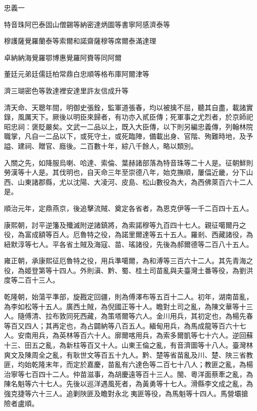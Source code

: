 
\begin{pinyinscope}
忠義一

特音珠阿巴泰固山僧錫等納密達炳圖等書寧阿感濟泰等

穆護薩覺羅蘭泰等索爾和諾齋薩穆等席爾泰滿達理

卓納納海覺羅鄂博惠覺羅阿賚等同阿爾

董廷元弟廷儒廷柏常鼎白忠順等格布庫阿爾津等

濟三瑚密色等敦達裡安達里許友信成升等

清天命、天聰年間，明御史張銓，監軍道張春，均以被擒不屈，聽其自盡，載諸實錄，風厲天下。厥後以明臣來歸者，有功亦入貳臣傳；死軍事之尤烈者，於京師祀昭忠祠：褒貶嚴矣。文武一二品以上，既入大臣傳，以下則另編忠義傳，列翰林院職掌，凡自一二品以下，或死守土，或死臨陣，備載出身、官階、殉難時地，及予謚、建祠、贈官、廕後。二百數十年，綜八千餘人，略以類別。

入關之先，如降服烏喇、哈達、索倫、葉赫諸部落為特音珠等二十人是。征朝鮮則勞漢等十人是。其伐明也，自天命三年至崇德八年，始克撫順，屢偪近畿，分下山西、山東諸郡縣，尤以沈陽、大凌河、皮島、松山數役為大，為西佛萊百六十二人是。

順治元年，定鼎燕京，後追擊流賊、奠定各省者，為恩克伊等一千二百四十五人。

康熙朝，討平逆籓及殲滅附逆諸鎮將，為索諾穆等九百四十七人。親征噶爾丹之役，為富成額等百人。厄魯特之役，為諾里爾達等五十五人。羅剎、西藏諸役，為紐默淳等七人。平各省土賊及海寇、苗、瑤諸役，先後為郝爾德等二百八十五人。

雍正朝，承康熙征厄魯特之役，用兵準噶爾，為和溥等三百六十二人。其先青海之役，為姬登第等十四人。外則滇、黔、蜀、桂土司苗亂與夫臺灣土番等役，為劉洪度等二百十三人。

乾隆朝，始蕩平準部，旋戡定回疆，則為傅澤布等五百十二人。初年，湖南苗亂，為李如松等十五人。廣西土賊，為倪國正等十人。瞻對土司之亂，為陳文華等十三人。隨傅清、拉布敦同死西藏，為策塔爾等六人。金川用兵，其初定也，為楊先春等百又四人；其再定也，為占闢納等八百五人。緬甸用兵，為馬成龍等百六十七人。安南用兵，為英林等百六十人。廓爾喀用兵，為索多爾凱等七十六人。逆回蘇十三、田五之亂，為新柱等百又十人。山東王倫之亂，有音濟圖等十八人。臺灣林爽文及陳周全之亂，有耿世文等百五十九人。黔、楚等省苗亂及川、楚、陜三省教匪，均始乾隆末年，而定於嘉慶，苗亂有六達色等二百七十八人；教匪之亂，為楊治寧等七百四十二人。仲苗滋事，為胡慶遠等百十三人。閩、粵洋面蔡牽之亂，為陳名魁等六十七人。先後以巡洋遇風死者，為黃勇等十七人。滑縣李文成之亂，為強克捷等六十三人。追剿陜匪及瞻對永北夷匪等役，為馬魁等十四人。馬營壩搶險者盧順。


\end{pinyinscope}
